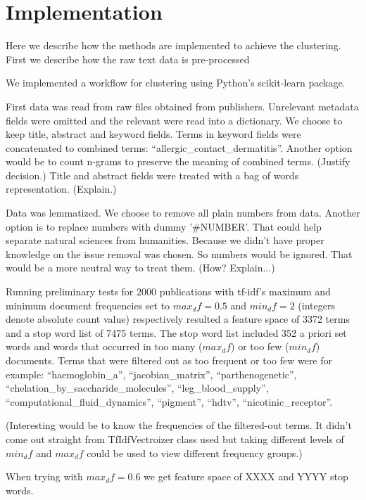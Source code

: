 \chapter{Implementation}
\label{chapter:implementation}


Here we describe how the methods are implemented to achieve the 
clustering. First we describe how the raw text data is 
pre-processed 

We implemented a workflow for clustering using Python's 
scikit-learn package. 

First data was read from raw files obtained from publishers. 
Unrelevant metadata fields were omitted and the relevant were read 
into a dictionary. We choose to keep title, abstract and keyword
fields. Terms in keyword fields were concatenated to combined 
terms: ``allergic\_contact\_dermatitis''. Another option would be to
count n-grams to preserve the meaning of combined terms. (Justify 
decision.) Title and abstract fields were treated with a bag of 
words representation. (Explain.)



Data was lemmatized. We choose to remove all plain numbers from
data. Another option is to replace numbers with dummy '\#NUMBER'.
That could help separate natural sciences from humanities. Because 
we didn't have proper knowledge on the issue removal was chosen. So 
numbers would be ignored. That would be a more neutral way to treat 
them. (How? Explain...)

Running preliminary tests for 2000 publications with tf-idf's maximum and 
minimum document frequencies set to $max_df=0.5$ 
and $min_df=2$ (integers denote absolute count value) respectively
resulted a feature space of 3372 terms and a stop word list of 7475 
terms. The stop word list included 352 a priori set words and words
that occurred in too many ($max_df$) or too few ($min_df$) 
documents. Terms that were filtered out as too frequent or too few
were for example: ``haemoglobin\_a'', ``jacobian\_matrix'', 
``parthenogenetic'', ``chelation\_by\_saccharide\_molecules'', 
``leg\_blood\_supply'', ``computational\_fluid\_dynamics'', 
``pigment'', ``hdtv'', ``nicotinic\_receptor''.

(Interesting would be to know the frequencies of the filtered-out 
terms. It didn't come out straight from TfIdfVectroizer class used 
but taking different levels of $min_df$ and $max_df$ could be used 
to view different frequency groups.)

When trying with $max_df=0.6$ we get feature space of XXXX and 
YYYY stop words.

